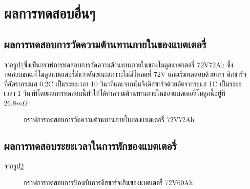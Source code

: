 \section{ผลการทดสอบอื่นๆ}
\subsection{ผลการทดสอบการวัดความต้านทานภายในของแบตเตอรี่}
จากรูป\ref{fig:DCIR_Test}ซึ่งเป็นกราฟการทดสอบการวัดความต้านทานภายในของโมดูลแบตเตอรี่ 72V72Ah ซึ่งทดสอบขณะที่โมดูลแบตเตอรี่มีแรงดันขณะสภาวะไม่มีโหลดที่ 72V และเริ่มทดสอบด้วยการ
ดิสชาร์จที่อัตรากระแส 0.2C เป็นระยะเวลา 10 วินาทีและจากนั้นจึงดิสชาร์จด้วยอัตรากระแส 1C เป็นระยะเวลา 1 วินาทีโดยผลการทดสอบนี้ทำให้ได้ค่าความต้านทานภายในของแบตเตอรี่โมดูลนี้อยู่ที่ $26.8m\Omega$
\begin{center}
	\begin{figure}[H]
		\centering
		\captionsetup{justification=centering,margin=2cm}
		\caption{กราฟการทดสอบการวัดความต้านทานภายในของแบตเตอรี่ 72V72Ah}
		\label{fig:DCIR_Test}
	\end{figure}
\end{center}
\subsection{ผลการทดสอบระยะเวลาในการพักของแบตเตอรี่}
จากรูป\ref{fig:Rest_Test}
\begin{center}
	\begin{figure}[H]
		\centering
		\captionsetup{justification=centering,margin=2cm}
		\caption{กราฟการทดสอบการป้องกันการดิสชาร์จเกินของแบตเตอรี่ 72V60Ah}
		\label{fig:Rest_Test}
	\end{figure}
\end{center}
